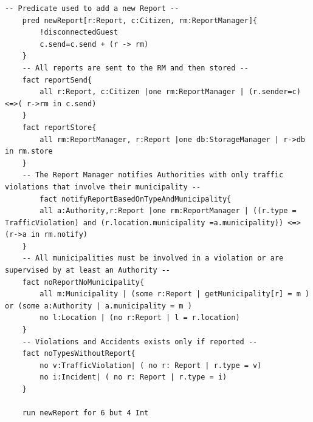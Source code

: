 \documentclass{report}
\begin{document}
\begin{lstlisting}[language=alloy]
	-- Predicate used to add a new Report --
	pred newReport[r:Report, c:Citizen, rm:ReportManager]{
		!disconnectedGuest
		c.send=c.send + (r -> rm)
	}
	-- All reports are sent to the RM and then stored --
	fact reportSend{
		all r:Report, c:Citizen |one rm:ReportManager | (r.sender=c) <=>( r->rm in c.send)
	}
	fact reportStore{
		all rm:ReportManager, r:Report |one db:StorageManager | r->db in rm.store
	}
	-- The Report Manager notifies Authorities with only traffic violations that involve their municipality --
		fact notifyReportBasedOnTypeAndMunicipality{
		all a:Authority,r:Report |one rm:ReportManager | ((r.type = TrafficViolation) and (r.location.municipality =a.municipality)) <=> (r->a in rm.notify) 
	}
	-- All municipalities must be involved in a violation or are supervised by at least an Authority --
	fact noReportNoMunicipality{
		all m:Municipality | (some r:Report | getMunicipality[r] = m ) or (some a:Authority | a.municipality = m )	
		no l:Location | (no r:Report | l = r.location)
	}
	-- Violations and Accidents exists only if reported --
	fact noTypesWithoutReport{
		no v:TrafficViolation| ( no r: Report | r.type = v)
		no i:Incident| ( no r: Report | r.type = i)	
	}

	run newReport for 6 but 4 Int
\end{lstlisting}
\end{document}
